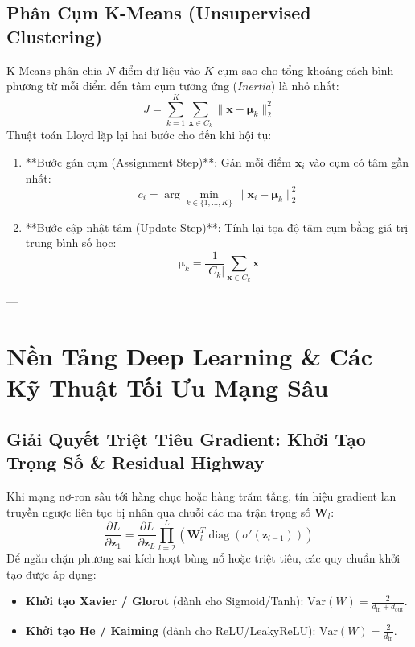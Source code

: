 \subsection{Phân Cụm K-Means (Unsupervised Clustering)}
K-Means phân chia $N$ điểm dữ liệu vào $K$ cụm sao cho tổng khoảng cách bình phương từ mỗi điểm đến tâm cụm tương ứng (\textit{Inertia}) là nhỏ nhất:
\begin{equation}
J = \sum_{k=1}^K \sum_{\mathbf{x} \in C_k} \|\mathbf{x} - \boldsymbol{\mu}_k\|_2^2
\end{equation}
Thuật toán Lloyd lặp lại hai bước cho đến khi hội tụ:
\begin{enumerate}
  \item **Bước gán cụm (Assignment Step)**: Gán mỗi điểm $\mathbf{x}_i$ vào cụm có tâm gần nhất:
  \begin{equation}
  c_i = \arg\min_{k \in \{1, \dots, K\}} \|\mathbf{x}_i - \boldsymbol{\mu}_k\|_2^2
  \end{equation}
  \item **Bước cập nhật tâm (Update Step)**: Tính lại tọa độ tâm cụm bằng giá trị trung bình số học:
  \begin{equation}
  \boldsymbol{\mu}_k = \frac{1}{|C_k|} \sum_{\mathbf{x} \in C_k} \mathbf{x}
  \end{equation}
\end{enumerate}

---

\section{Nền Tảng Deep Learning \& Các Kỹ Thuật Tối Ưu Mạng Sâu}
\label{sec:deep-learning-foundations}

\subsection{Giải Quyết Triệt Tiêu Gradient: Khởi Tạo Trọng Số \& Residual Highway}
Khi mạng nơ-ron sâu tới hàng chục hoặc hàng trăm tầng, tín hiệu gradient lan truyền ngược liên tục bị nhân qua chuỗi các ma trận trọng số $\mathbf{W}_l$:
\begin{equation}
\frac{\partial L}{\partial \mathbf{z}_1} = \frac{\partial L}{\partial \mathbf{z}_L} \prod_{l=2}^L \left( \mathbf{W}_l^T \operatorname{diag}(\sigma'(\mathbf{z}_{l-1})) \right)
\end{equation}
Để ngăn chặn phương sai kích hoạt bùng nổ hoặc triệt tiêu, các quy chuẩn khởi tạo được áp dụng:
\begin{itemize}
  \item \textbf{Khởi tạo Xavier / Glorot} (dành cho Sigmoid/Tanh): $\text{Var}(W) = \frac{2}{d_{\text{in}} + d_{\text{out}}}$.
  \item \textbf{Khởi tạo He / Kaiming} (dành cho ReLU/LeakyReLU): $\text{Var}(W) = \frac{2}{d_{\text{in}}}$.
\end{itemize}


